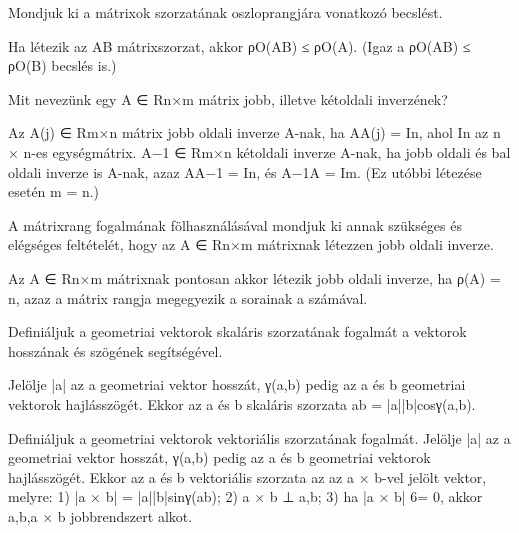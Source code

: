 \begin{frame}
  \begin{tcolorbox}[title={15}]
   Mondjuk ki a mátrixok szorzatának oszloprangjára vonatkozó becslést.


  \tcblower
Ha létezik az AB mátrixszorzat, akkor ρO(AB) ≤ ρO(A). (Igaz a ρO(AB) ≤ ρO(B) becslés is.)

  \end{tcolorbox}
\end{frame}


\begin{frame}
  \begin{tcolorbox}[title={16}]
     Mit nevezünk egy A ∈ Rn×m mátrix jobb, illetve kétoldali inverzének?

  \tcblower
Az A(j) ∈ Rm×n mátrix jobb oldali inverze A-nak, ha AA(j) = In, ahol In az n × n-es egységmátrix. A−1 ∈ Rm×n kétoldali inverze A-nak, ha jobb oldali és bal oldali inverze is A-nak, azaz AA−1 = In, és A−1A = Im. (Ez utóbbi létezése esetén m = n.)

  \end{tcolorbox}
\end{frame}


\begin{frame}
  \begin{tcolorbox}[title={17}]
    A mátrixrang fogalmának fölhasználásával mondjuk ki annak szükséges és elégséges feltételét, hogy az A ∈ Rn×m mátrixnak létezzen jobb oldali inverze.

  \tcblower
Az A ∈ Rn×m mátrixnak pontosan akkor létezik jobb oldali inverze, ha ρ(A) = n, azaz a mátrix rangja megegyezik a sorainak a számával.

  \end{tcolorbox}
\end{frame}


\begin{frame}
  \begin{tcolorbox}[title={18}]
   Deﬁniáljuk a geometriai vektorok skaláris szorzatának fogalmát a vektorok hosszának és szögének segítségével.

  \tcblower
Jelölje |a| az a geometriai vektor hosszát, γ(a,b) pedig az a és b geometriai vektorok hajlásszögét. Ekkor az a és b skaláris szorzata ab = |a||b|cosγ(a,b).

  \end{tcolorbox}
\end{frame}


\begin{frame}
  \begin{tcolorbox}[title={19}]
   Deﬁniáljuk a geometriai vektorok vektoriális szorzatának fogalmát.
  \tcblower
Jelölje |a| az a geometriai vektor hosszát, γ(a,b) pedig az a és b geometriai vektorok hajlásszögét. Ekkor az a és b vektoriális szorzata az az a × b-vel jelölt vektor, melyre: 1) |a × b| = |a||b|sinγ(ab); 2) a × b ⊥ a,b; 3) ha |a × b| 6= 0, akkor a,b,a × b jobbrendszert alkot.

  \end{tcolorbox}
\end{frame}


